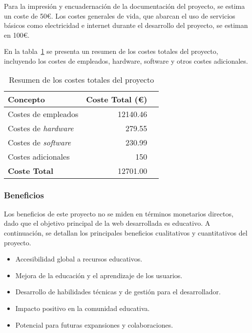 Para la impresión y encuadernación de la documentación del proyecto, se estima un coste de 50€. Los costes generales de vida, que abarcan el uso de servicios básicos como electricidad e internet durante el desarrollo del proyecto, se estiman en 100€.

En la tabla~\ref{tabla:costes_totales} se presenta un resumen de los costes totales del proyecto, incluyendo los costes de empleados, hardware, software y otros costes adicionales.

\begin{table}[H]
    \centering
    \begin{tabular}{lrr}
        \toprule
        \textbf{Concepto}      & \textbf{Coste Total (€)} \\ \midrule
        Costes de empleados     & 12140.46                      \\
        Costes de \textit{hardware} & 279.55                       \\
        Costes de \textit{software} & 230.99                       \\
        Costes adicionales      & 150                         \\ \midrule
        \textbf{Coste Total}    & 12701.00                      \\ \bottomrule
    \end{tabular}
    \caption{Resumen de los costes totales del proyecto}
    \label{tabla:costes_totales}
\end{table}

\subsubsection{Beneficios}
Los beneficios de este proyecto no se miden en términos monetarios directos, dado que el objetivo principal de la web desarrollada es educativo. A continuación, se detallan los principales beneficios cualitativos y cuantitativos del proyecto.

\begin{itemize}
    \item Accesibilidad global a recursos educativos.
    \item Mejora de la educación y el aprendizaje de los usuarios.
    \item Desarrollo de habilidades técnicas y de gestión para el desarrollador.
    \item Impacto positivo en la comunidad educativa.
    \item Potencial para futuras expansiones y colaboraciones.
\end{itemize}

